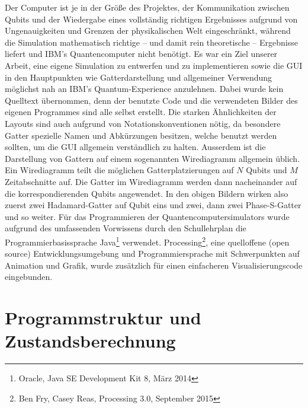 \documentclass[12pt]{report}
\begin{document}
Der Computer ist je in der Größe des Projektes, der Kommunikation zwischen Qubits und der Wiedergabe eines vollständig richtigen Ergebnisses aufgrund von Ungenauigkeiten und Grenzen der physikalischen Welt eingeschränkt, während die Simulation mathematisch richtige -- und damit rein theoretische -- Ergebnisse liefert und IBM's Quantencomputer nicht benötigt. Es war ein Ziel unserer Arbeit, eine eigene Simulation zu entwerfen und zu implementieren sowie die GUI in den Hauptpunkten wie Gatterdarstellung und allgemeiner Verwendung möglichst nah an IBM's  \glqq Quantum-Experience\grqq{} anzulehnen.
Dabei wurde kein Quelltext übernommen, denn der benutzte Code und die verwendeten Bilder des eigenen Programmes sind alle selbst erstellt. Die starken Ähnlichkeiten der Layouts sind auch aufgrund von Notationskonventionen nötig, da besondere Gatter spezielle Namen und Abkürzungen besitzen, welche benutzt werden sollten, um die GUI allgemein verständlich zu halten. Ausserdem ist die Darstellung von Gattern auf einem sogenannten \glqq Wirediagramm\grqq{} allgemein üblich. Ein Wirediagramm teilt die möglichen Gatterplatzierungen auf $N$ Qubits und $M$ Zeitabschnitte auf. Die Gatter im Wirediagramm werden dann nacheinander auf die korrespondierenden Qubits angewendet. In den obigen Bildern wirken also zuerst zwei Hadamard-Gatter auf Qubit eins und zwei, dann zwei Phase-S-Gatter und so weiter.
Für das Programmieren der Quantencomputersimulators wurde aufgrund des umfassenden Vorwissens durch den Schullehrplan die Programmierbasissprache Java\footnote{Oracle, Java SE Development Kit 8, März 2014} verwendet. Processing\footnote{Ben Fry, Casey Reas, Processing 3.0, September 2015}, eine quelloffene (open source) Entwicklungsumgebung und Programmiersprache mit Schwerpunkten auf Animation und Grafik, wurde zusätzlich für einen einfacheren Visualisierungscode eingebunden.

\section{Programmstruktur und Zustandsberechnung}
\end{document}
